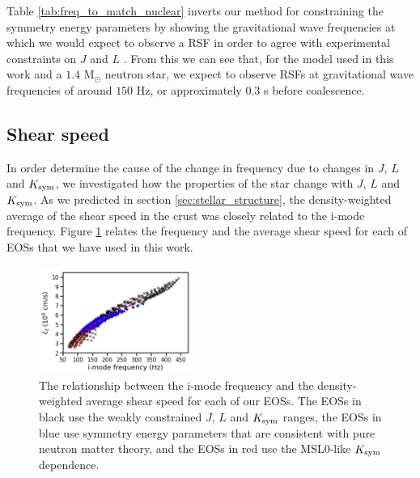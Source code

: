 \documentclass[fleqn,usenatbib]{mnras}
\begin{document}
Table \ref{tab:freq_to_match_nuclear} inverts our method for constraining the symmetry energy parameters by showing the gravitational wave frequencies at which we would expect to observe a RSF in order to agree with experimental constraints on $J$ and $L$ \citep{lattimer2013constraining}. From this we can see that, for the model used in this work and a $1.4$ M$_{\odot}$ neutron star, we expect to observe RSFs at gravitational wave frequencies of around $150$ Hz, or approximately $0.3$ s before coalescence.









\subsection{Shear speed}

\hspace{\parindent}In order determine the cause of the change in frequency due to changes in $J$, $L$ and $K_{\rm sym}$, we investigated how the properties of the star change with $J$, $L$ and $K_{\rm sym}$. As we predicted in section \ref{sec:stellar_structure}, the density-weighted average of the shear speed in the crust was closely related to the i-mode frequency. Figure \ref{fig:f_avct_MSL0} relates the frequency and the average shear speed for each of EOSs that we have used in this work.


\begin{figure}
\centering
\includegraphics[width=0.45\textwidth,angle=0]{f_vs_avct_grid_PNM_MSL0.png}
\caption{The relationship between the i-mode frequency and the density-weighted average shear speed for each of our EOSs. The EOSs in black use the weakly constrained $J$, $L$ and $K_{\rm sym}$ ranges, the EOSs in blue use symmetry energy parameters that are consistent with pure neutron matter theory, and the EOSs in red use the MSL0-like $K_{\rm sym}$ dependence.}
\label{fig:f_avct_MSL0}
\end{figure}
\end{document}
